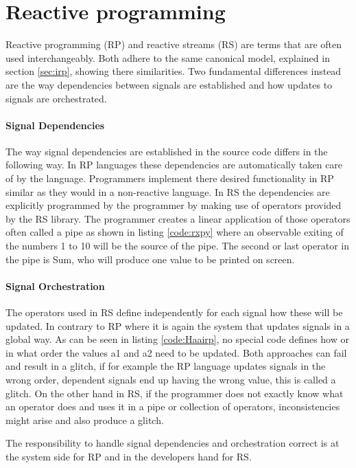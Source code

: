 \documentclass[a4paper]{book}
\begin{document}
\chapter{Reactive programming}

Reactive programming (RP) and reactive streams (RS) are terms that are often used interchangeably. Both adhere to the same canonical model, explained in section \ref{sec:irp}, showing there similarities. Two fundamental differences instead are the way dependencies between signals are established and how updates to signals are orchestrated.

\subsubsection{Signal Dependencies}
The way signal dependencies are established in the source code differs in the following way. In RP languages these dependencies are automatically taken care of by the language. Programmers implement there desired functionality in RP similar as they would in a non-reactive language. In RS the dependencies are explicitly programmed by the programmer by making use of operators provided by the RS library. The programmer creates a linear application of those operators often called a pipe as shown in listing \ref{code:rxpy} where an observable exiting of the numbers 1 to 10 will be the source of the pipe. The second or last operator in the pipe is Sum, who will produce one value to be printed on screen.

\subsubsection{Signal Orchestration}
The operators used in RS define independently for each signal how these will be updated. In contrary to RP where it is again the system that updates signals in a global way. As can be seen in listing \ref{code:Haairp}, no special code defines how or in what order the values a1 and a2 need to be updated. Both approaches can fail and result in a glitch, if for example the RP language updates signals in the wrong order, dependent signals end up having the wrong value, this is called a glitch. On the other hand in RS, if the programmer does not exactly know what an operator does and uses it in a pipe or collection of operators, inconsistencies might arise and also produce a glitch. 

\vspace{1em} %
\noindent
The responsibility to handle signal dependencies and orchestration correct is at the system side for RP and in the developers hand for RS.
\end{document}
